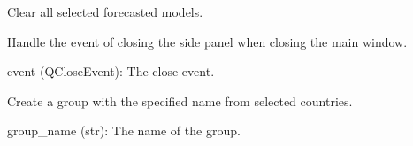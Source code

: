 \documentclass[letterpaper,10pt,english]{sphinxmanual}
\begin{document}
\begin{fulllineitems}
\begin{fulllineitems}
\begin{description}
\end{description}

\end{fulllineitems}


\begin{fulllineitems}
\label{\detokenize{Mainwindow:Mainwindow.MainWindow.clear_all}}
\pysigstartsignatures
{}
\pysigstopsignatures
\sphinxAtStartPar
Clear all selected forecasted models.

\end{fulllineitems}


\begin{fulllineitems}
\label{\detokenize{Mainwindow:Mainwindow.MainWindow.closeEvent}}
\pysigstartsignatures
{}
\pysigstopsignatures
\sphinxAtStartPar
Handle the event of closing the side panel when closing the main window.
\begin{description}
\sphinxAtStartPar
event (QCloseEvent): The close event.

\end{description}

\end{fulllineitems}


\begin{fulllineitems}
\label{\detokenize{Mainwindow:Mainwindow.MainWindow.create_group}}
\pysigstartsignatures
{}
\pysigstopsignatures
\sphinxAtStartPar
Create a group with the specified name from selected countries.
\begin{description}
\sphinxAtStartPar
group\_name (str): The name of the group.

\end{description}

\end{fulllineitems}


\end{fulllineitems}
\end{document}
